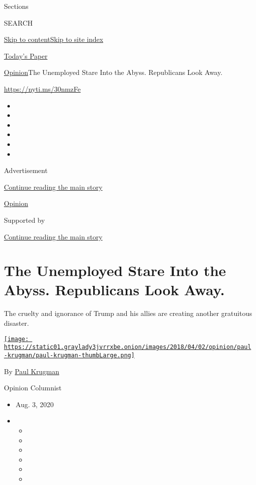 Sections

SEARCH

\protect\hyperlink{site-content}{Skip to
content}\protect\hyperlink{site-index}{Skip to site index}

\href{https://myaccount.nytimes3xbfgragh.onion/auth/login?response_type=cookie\&client_id=vi}{}

\href{https://www.nytimes3xbfgragh.onion/section/todayspaper}{Today's
Paper}

\href{/section/opinion}{Opinion}\textbar{}The Unemployed Stare Into the
Abyss. Republicans Look Away.

\url{https://nyti.ms/30nmzFe}

\begin{itemize}
\item
\item
\item
\item
\item
\item
\end{itemize}

Advertisement

\protect\hyperlink{after-top}{Continue reading the main story}

\href{/section/opinion}{Opinion}

Supported by

\protect\hyperlink{after-sponsor}{Continue reading the main story}

\hypertarget{the-unemployed-stare-into-the-abyss-republicans-look-away}{%
\section{The Unemployed Stare Into the Abyss. Republicans Look
Away.}\label{the-unemployed-stare-into-the-abyss-republicans-look-away}}

The cruelty and ignorance of Trump and his allies are creating another
gratuitous disaster.

\href{https://www.nytimes3xbfgragh.onion/by/paul-krugman}{\texttt{[image: https://static01.graylady3jvrrxbe.onion/images/2018/04/02/opinion/paul-krugman/paul-krugman-thumbLarge.png]}}

By \href{https://www.nytimes3xbfgragh.onion/by/paul-krugman}{Paul
Krugman}

Opinion Columnist

\begin{itemize}
\item
  Aug. 3, 2020
\item
  \begin{itemize}
  \item
  \item
  \item
  \item
  \item
  \item
  \end{itemize}
\end{itemize}

